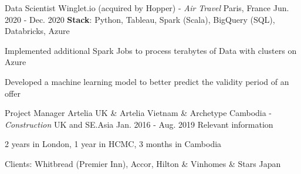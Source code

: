 \begin{cventries}
  \cventry
    {Data Scientist} %
    {Winglet.io (acquired by Hopper) - \emph{Air Travel}} %
    {Paris, France} %
    {Jun. 2020 - Dec. 2020} %
    {\textbf{Stack}: Python, Tableau, Spark (Scala), BigQuery (SQL), Databricks, Azure} %
    {
      \begin{cvitems} %
       \item {Implemented additional Spark Jobs to process terabytes of Data with clusters on Azure}
       \item {Developed a machine learning model to better predict the validity period of an offer }
      \end{cvitems}
    }

  \cventry
    {Project Manager} %
    {Artelia UK \& Artelia Vietnam \& Archetype Cambodia - \emph{Construction}} %
    {UK and SE.Asia} %
    {Jan. 2016 - Aug. 2019} %
    {Relevant information} %
    {
      \begin{cvitems} %
        \item {2 years in London, 1 year in HCMC, 3 months in Cambodia}
        \item {Clients: Whitbread (Premier Inn), Accor, Hilton \& Vinhomes \& Stars Japan} 
      \end{cvitems}
    }

\end{cventries}
